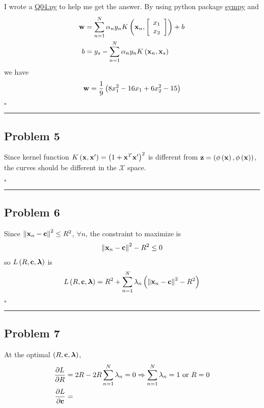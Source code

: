 \documentclass[12pt]{article}
\newcommand*{\QEDB}{\hfill\ensuremath{\square}}
\newcommand{\SBrackets}[1]{\left[#1\right]}
\newcommand{\ParTh}[1]{\left(#1\right)}
\newcommand{\BF}[1]{{\bf#1}}
\newcommand{\VecAbsVal}[1]{\left\|#1\right\|}
\newcommand{\Matrix}[2]{\SBrackets{\begin{array}{#1}#2\end{array}}}
\newcommand{\horrule}[1]{\rule{\linewidth}{#1}}
\begin{document}
I wrote a \url{Q04.py} to help me get the answer. By using python package \url{sympy} and
\begin{align}
\BF{w}&=\sum_{n=1}^{N}\alpha_ny_nK\ParTh{\BF{x}_n,\Matrix{c}{x_1\\x_2}}+b\\
b&=y_s-\sum_{n=1}^{N}\alpha_ny_nK\ParTh{\BF{x}_n,\BF{x}_s}
\end{align}
we have
\begin{align}
\BF{w}=\dfrac{1}{9}\ParTh{8x^2_1 - 16x_1 + 6x^2_2-15}
\end{align}

\QEDB

\horrule{0.5pt}

\subsection*{Problem 5}

Since kernel function $K\ParTh{\BF{x},\BF{x}^\prime}=\ParTh{1+\BF{x}^T\BF{x}^\prime}^2$ is different from $\BF{z}=\ParTh{\phi\ParTh{\BF{x}},\phi\ParTh{\BF{x}}}$, the curves should be different in the $\mathcal{X}$ space.

\QEDB

\horrule{0.5pt}

\subsection*{Problem 6}

Since $\VecAbsVal{\BF{x}_n-\BF{c}}^2\leq R^2$, $\forall n$, the constraint to maximize is
\begin{align}
\VecAbsVal{\BF{x}_n-\BF{c}}^2-R^2\leq0
\end{align}
so $L\ParTh{R,\BF{c},\bm{\lambda}}$ is
\begin{align}
L\ParTh{R,\BF{c},\bm{\lambda}}=R^2+\sum_{n=1}^{N}\lambda_n\ParTh{\VecAbsVal{\BF{x}_n-\BF{c}}^2-R^2}
\end{align}

\QEDB

\horrule{0.5pt}

\subsection*{Problem 7}

At the optimal $(R,\BF{c},\bm{\lambda})$,
\begin{align}
\dfrac{\partial L}{\partial R}&=2R-2R\sum_{n=1}^{N}\lambda_n=0\Rightarrow\sum_{n=1}^{N}\lambda_n=1\text{ or }R=0\\
\dfrac{\partial L}{\partial \BF{c}}&=
\end{align}
\end{document}
